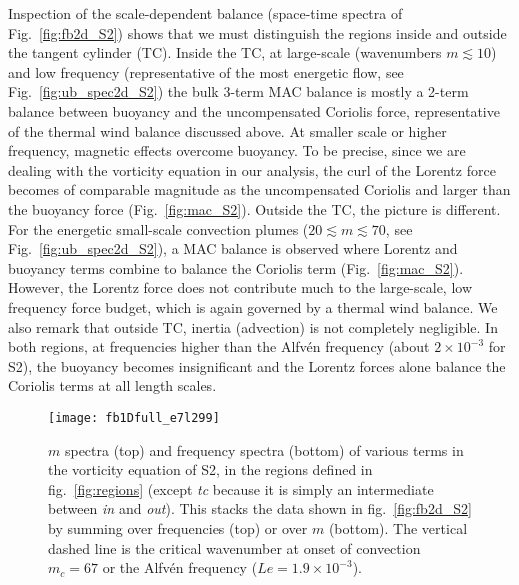 \documentclass[12pt, a4paper]{article}
\begin{document}
Inspection of the scale-dependent balance (space-time spectra of Fig.~\ref{fig:fb2d_S2}) shows that we must distinguish the regions inside and outside the tangent cylinder (TC).
Inside the TC, at large-scale (wavenumbers $m \lesssim 10$) and low frequency (representative of the most energetic flow, see Fig.~\ref{fig:ub_spec2d_S2}) the bulk 3-term MAC balance is mostly a 2-term balance between buoyancy and the uncompensated Coriolis force, representative of the thermal wind balance discussed above.
At smaller scale or higher frequency, magnetic effects overcome buoyancy.
To be precise, since we are dealing with the vorticity equation in our analysis, the curl of the Lorentz force becomes of comparable magnitude 
as the uncompensated Coriolis and larger than the buoyancy force (Fig.~\ref{fig:mac_S2}).
Outside the TC, the picture is different. For the energetic small-scale convection plumes ($20 \lesssim m \lesssim 70$, see Fig.~\ref{fig:ub_spec2d_S2}), a MAC balance is observed where Lorentz and buoyancy terms combine to balance the Coriolis term (Fig.~\ref{fig:mac_S2}).
However, the Lorentz force does not contribute much to the large-scale, low frequency force budget, which is again governed by a thermal wind balance.
We also remark that outside TC, inertia (advection) is not completely negligible.
In both regions, at frequencies higher than the Alfvén frequency (about $2 \times 10^{-3}$ for S2), the buoyancy becomes insignificant and the Lorentz forces alone balance the Coriolis terms at all length scales.

\begin{figure}
\begin{center}
\texttt{[image: fb1Dfull\_e7l299]}
\caption{$m$ spectra (top) and frequency spectra (bottom) of various terms in the vorticity equation of S2, in the regions defined in fig.~\ref{fig:regions} (except \textit{tc} because it is simply an intermediate between \textit{in} and \textit{out}).
This stacks the data shown in fig.~\ref{fig:fb2d_S2} by summing over frequencies (top) or over $m$ (bottom).
The vertical dashed line is the critical wavenumber at onset of convection $m_c=67$ or the Alfvén frequency ($Le=1.9 \times 10^{-3}$).
}
\label{fig:fb1d_S2}
\end{center}
\end{figure}
\end{document}
